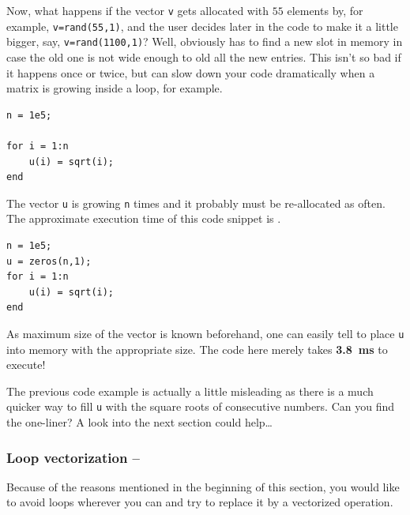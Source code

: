 
Now, what happens if the vector \lstinline!v! gets allocated with $55$ elements by, for example, \lstinline!v=rand(55,1)!, and the user decides later in the code to make it a little bigger, say, \lstinline!v=rand(1100,1)!? Well, obviously \matlab{} has to find a new slot in memory in case the old one is not wide enough to old all the new entries. This isn't so bad if it happens once or twice, but can slow down your code dramatically when a matrix is growing inside a loop, for example.


\hfill
\begin{minipage}[t]{.45\textwidth}
\begin{lstlisting}[framerule=2pt,rulecolor=\color{badred}]
n = 1e5;

for i = 1:n
    u(i) = sqrt(i);
end
\end{lstlisting}
The vector \lstinline!u! is growing \lstinline!n! times and it probably must be re-allocated as often. The approximate execution time of this code snippet is .
\end{minipage}
\hfill
\begin{minipage}[t]{.45\textwidth}
\begin{lstlisting}[framerule=2pt,rulecolor=\color{goodgreen}]
n = 1e5;
u = zeros(n,1);
for i = 1:n
    u(i) = sqrt(i);
end
\end{lstlisting}
As maximum size of the vector is known beforehand, one can easily tell \matlab{} to place \lstinline!u! into memory with the appropriate size. The code here merely takes \textbf{\SI{3.8}{\milli\second}} to execute!
\end{minipage}
\hfill

\begin{remark}
The previous code example is actually a little misleading as there is a much quicker way to fill \lstinline!u! with the square roots of consecutive numbers. Can you find the one-liner? A look into the next section could help\dots
\end{remark}


\subsubsection{Loop vectorization -- \fastsymbol\fastsymbol\fastsymbol\fastsymbol\fastsymbol}

Because of the reasons mentioned in the beginning of this section, you would like to avoid loops wherever you can and try to replace it by a vectorized operation.

